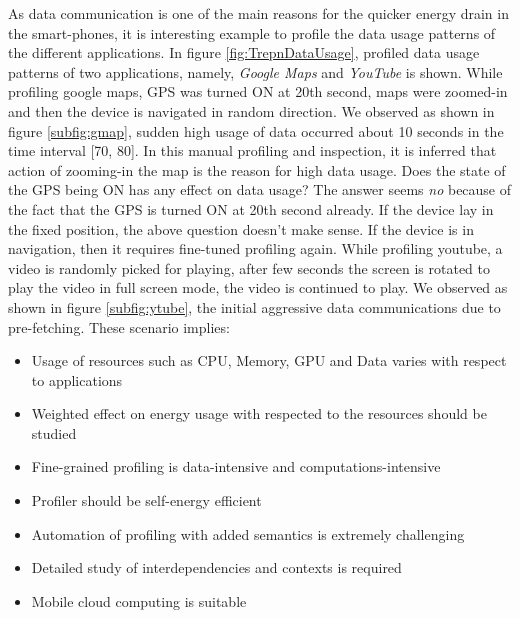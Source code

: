 As data communication is one of the main reasons for the quicker energy drain in the smart-phones, it is interesting example to profile the data usage patterns of the different applications. In figure \ref{fig:TrepnDataUsage}, profiled data usage patterns of two applications, namely, \textit{Google Maps} and \textit{YouTube} is shown. While profiling google maps, GPS was turned ON at 20th second, maps were zoomed-in and then the device is navigated in random direction. We observed as shown in figure \ref{subfig:gmap}, sudden high usage of data occurred about 10 seconds in the time interval [70, 80]. In this manual profiling and inspection, it is inferred that action of zooming-in the map is the reason for high data usage. Does the state of the GPS being ON has any effect on data usage? The answer seems \emph{no} because of the fact that the GPS is turned ON at 20th second already. If the device lay in the fixed position, the above question doesn't make sense. If the device is in navigation, then it requires fine-tuned profiling again. While profiling youtube, a video is randomly picked for playing, after few seconds the screen is rotated to play the video in full screen mode, the video is continued to play. We observed as shown in figure \ref{subfig:ytube}, the initial aggressive data communications due to pre-fetching. 
These scenario implies: 
\begin{itemize}
\item Usage of resources such as CPU, Memory, GPU and Data varies with respect to applications
\item Weighted effect on energy usage with respected to the resources should be studied
\item Fine-grained profiling is data-intensive and computations-intensive
\item Profiler should be self-energy efficient
\item Automation of profiling with added semantics is extremely challenging
\item Detailed study of interdependencies and contexts is required
\item Mobile cloud computing is suitable
\end{itemize}

